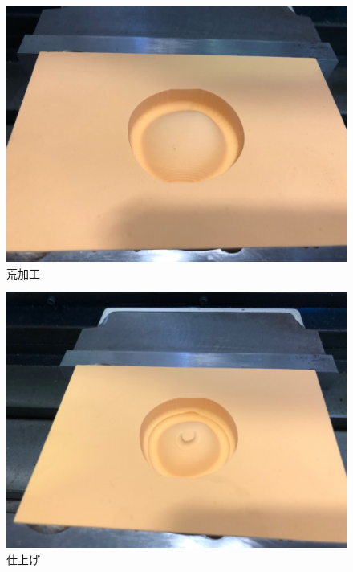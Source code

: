 
\vspace*{1zh}
\begin{figure}[H]
\centering
\includegraphics[scale=0.17]{No4/fig/fig41.jpg}
\caption{荒加工}
\label{fig:ncvc41}
\end{figure}

\begin{figure}[H]
\centering
\includegraphics[scale=0.17]{No4/fig/fig42.jpg}
\caption{仕上げ}
\label{fig:ncvc42}
\end{figure}

